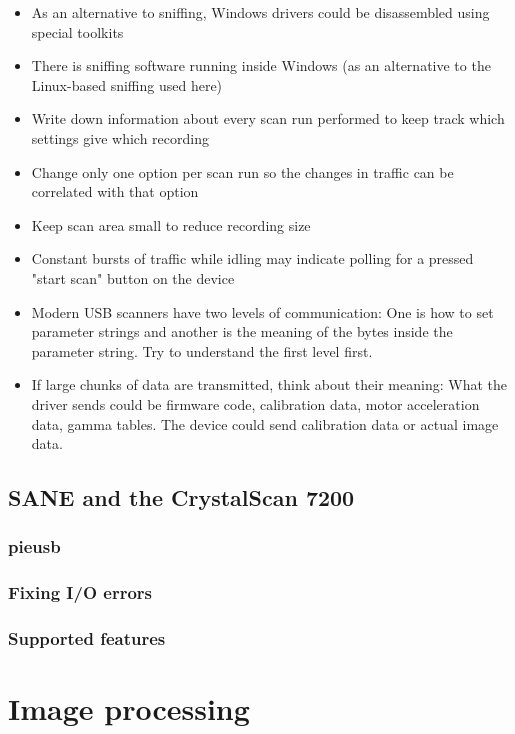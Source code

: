 \documentclass{article}
\begin{document}
\begin{itemize}
  \item As an alternative to sniffing, Windows drivers could be disassembled
        using special toolkits
  \item There is sniffing software running inside Windows (as an alternative to
        the Linux-based sniffing used here)
  \item Write down information about every scan run performed to keep track which
        settings give which recording
  \item Change only one option per scan run so the changes in traffic can be correlated
        with that option
  \item Keep scan area small to reduce recording size
  \item Constant bursts of traffic while idling may indicate polling for a pressed "start
        scan" button on the device
  \item Modern USB scanners have two levels of communication: One is how to set parameter
        strings and another is the meaning of the bytes inside the parameter string.
        Try to understand the first level first.
  \item If large chunks of data are transmitted, think about their meaning:
        What the driver sends could be firmware code, calibration data, motor acceleration data, gamma tables. The device could send calibration data or actual image data.
\end{itemize}

\subsection{SANE and the CrystalScan 7200}

\subsubsection{pieusb}

\subsubsection{Fixing I/O errors}

\subsubsection{Supported features}

\section{Image processing}
\label{sec:imgproc}
\end{document}
